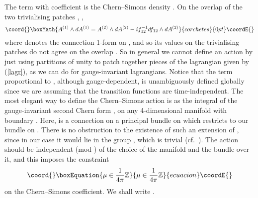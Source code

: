 \documentclass[a4paper,11pt]{article}
\begin{document}
The term with coefficient \myHighlight{$\mu$}\coordHE{} is the Chern--Simons
density \coordHE{}. On the overlap of the two trivialising
patches \coordHE{}, \coordHE{},
\[\coord{}\boxMath{
A^{(1)}\wedge dA^{(1)} =
A^{(2)}\wedge dA^{(2)} -if_{12}^{-1}df_{12}\wedge dA^{(2)}
}{corchetes}{0pt}\coordE{}\]
where \coordHE{} denotes the connection 1-form on \coordHE{},
and so its values on the trivialising patches do not agree on the
overlap \coordHE{}. 
So in general we cannot define an action by just using partitions of 
unity to patch together pieces of the lagrangian given by
(\ref{lagr}), as we can do for gauge-invariant lagrangians. 
Notice that the term proportional to \coordHE{}, although gauge-dependent, 
is unambiguously defined globally since we are assuming that the transition 
functions are time-independent.
The most elegant way to define the Chern--Simons action is as the 
integral of the gauge-invariant second Chern form \coordHE{}, on any
4-dimensional manifold \coordHE{} with boundary
\coordHE{}. 
Here, \coordHE{} is a connection on a principal \coordHE{} bundle on \coordHE{}
which restricts to our bundle \coordHE{} on \coordHE{}.
There is no obstruction to the existence of such an extension
of \coordHE{}, since in our case it
would lie in the group \coordHE{},
which is trivial (cf.~\cite{DW}). The action should be independent 
(mod \myHighlight{$2\pi$}\coordHE{}) of the choice of the manifold \coordHE{} and the bundle over it, 
and this imposes the constraint
\begin{equation}\coord{}\boxEquation{ \label{mu}
\mu\in \frac{1}{4 \pi} \mathbb{Z}
}{ \mu\in \frac{1}{4 \pi} \mathbb{Z}
}{ecuacion}\coordE{}\end{equation}
on the Chern--Simons coefficient. We shall write \myHighlight{$\kappa:=4\pi \mu$}\coordHE{}.
\end{document}
